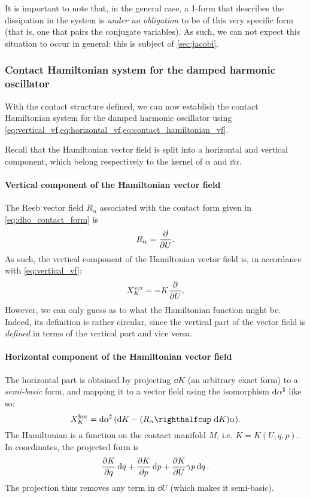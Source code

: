 It is important to note that, in the general case, a 1-form that describes the dissipation in the system is \emph{under no obligation} to be of this very specific form (that is, one that pairs the conjugate variables). As such, we can not expect this situation to occur in general: this is subject of \cref{sec:jacobi}.

\subsubsection{Contact Hamiltonian system for the damped harmonic oscillator}
With the contact structure defined, we can now establish the contact Hamiltonian system for the damped harmonic oscillator using \cref{eq:vertical_vf,eq:horizontal_vf,eq:contact_hamiltonian_vf}.

Recall that the Hamiltonian vector field is split into a horizontal and vertical component, which belong respectively to the kernel of $\alpha$ and $\dd{\alpha}$.

\paragraph{Vertical component of the Hamiltonian vector field} The Reeb vector field $R_\alpha$ associated with the contact form given in \cref{eq:dho_contact_form} is 
$$ R_\alpha = \pdv{}{U}. $$
As such, the vertical component of the Hamiltonian vector field is, in accordance with \cref{eq:vertical_vf}:
\begin{equation}
    X_K^\text{ver} = -K\pdv{}{U}.
    \label{eq:dho_vertical}
\end{equation}
However, we can only guess as to what the Hamiltonian function might be. Indeed, its definition is rather circular, since the vertical part of the vector field is \emph{defined} in terms of the vertical part and vice versa.

\paragraph{Horizontal component of the Hamiltonian vector field} The horizontal part is obtained by projecting $\dd{K}$ (an arbitrary exact form) to a \emph{semi-basic} form, and mapping it to a vector field using the isomorphism $\dd{\alpha}^\sharp$ like so:
$$ X_K^\text{hor} = \fromDual{\dd{\alpha}}(\dd{K} - \qty(\intpr{R_\alpha}{\dd{K}})\alpha). $$
The Hamiltonian is a function on the contact manifold $M$, i.e. $K = K(U, q, p)$. In coordinates, the projected form is
\begin{equation}
    \pdv{K}{q}\dd{q} + \pdv{K}{p}\dd{p} + \pdv{K}{U} \gamma p \dd{q}.
    \label{eq:contact_semi-basic}
\end{equation}
The projection thus removes any term in $\dd{U}$ (which makes it semi-basic).

